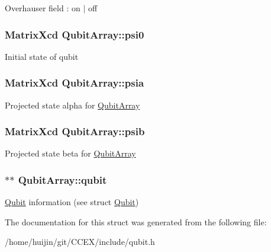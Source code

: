 Overhauser field \-: on $|$ off \hypertarget{structQubitArray_a17543dd30e2e5ef672ff5f751119beea}{
\subsubsection[{psi0}]{\setlength{\rightskip}{0pt plus 5cm}Matrix\-Xcd Qubit\-Array\-::psi0}}\label{structQubitArray_a17543dd30e2e5ef672ff5f751119beea}
Initial state of qubit \hypertarget{structQubitArray_a168f33429921f2605e8c3ab850d3e6d9}{
\subsubsection[{psia}]{\setlength{\rightskip}{0pt plus 5cm}Matrix\-Xcd Qubit\-Array\-::psia}}\label{structQubitArray_a168f33429921f2605e8c3ab850d3e6d9}
Projected state alpha for \hyperlink{structQubitArray}{Qubit\-Array} \hypertarget{structQubitArray_ad88cb397f3656eb7ac316e966d5e9172}{
\subsubsection[{psib}]{\setlength{\rightskip}{0pt plus 5cm}Matrix\-Xcd Qubit\-Array\-::psib}}\label{structQubitArray_ad88cb397f3656eb7ac316e966d5e9172}
Projected state beta for \hyperlink{structQubitArray}{Qubit\-Array} \hypertarget{structQubitArray_ae87046f60e524d2aed1f6605c746d86e}{
\subsubsection[{qubit}]{$\ast$$\ast$ Qubit\-Array\-::qubit}}\label{structQubitArray_ae87046f60e524d2aed1f6605c746d86e}
\hyperlink{structQubit}{Qubit} information (see struct \hyperlink{structQubit}{Qubit}) 

The documentation for this struct was generated from the following file\-:\begin{DoxyCompactItemize}
\item 
/home/huijin/git/\-C\-C\-E\-X/include/qubit.\-h\end{DoxyCompactItemize}
